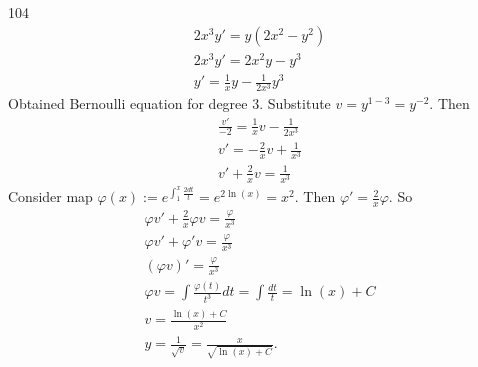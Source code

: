 \documentclass[12pt,a4paper]{article}
\begin{document}
    \begin{problem}{104}
        \begin{gather*}
            2x^3 y' = y(2x^2 - y^2)\\
            2x^3 y' = 2x^2 y - y^3\\
            y' = \frac{1}{x} y - \frac{1}{2x^3} y^3
        \end{gather*}
        Obtained Bernoulli equation for degree $3$. Substitute $v = y^{1-3} = y^{-2}$. Then
        \begin{gather*}
            \frac{v'}{-2} = \frac{1}{x} v - \frac{1}{2x^3}\\
            v' = -\frac{2}{x} v + \frac{1}{x^3}\\
            v' + \frac{2}{x} v = \frac{1}{x^3}
        \end{gather*}
        Consider map $\varphi(x) := e^{\int_1^x \frac{2dt}{t}} = e^{2\ln(x)} = x^2$. Then $\varphi' = \frac{2}{x} \varphi$. So
        \begin{gather*}
            \varphi v' + \frac{2}{x} \varphi v = \frac{\varphi}{x^3}\\
            \varphi v' + \varphi' v = \frac{\varphi}{x^3}\\
            (\varphi v)' = \frac{\varphi}{x^3}\\
            \varphi v = \int \frac{\varphi(t)}{t^3} dt = \int \frac{dt}{t} = \ln(x) + C\\
            v = \frac{\ln(x) + C}{x^2}\\
            y = \frac{1}{\sqrt{v}} = \frac{x}{\sqrt{\ln(x) + C}}.
        \end{gather*}
    \end{problem}
\end{document}
